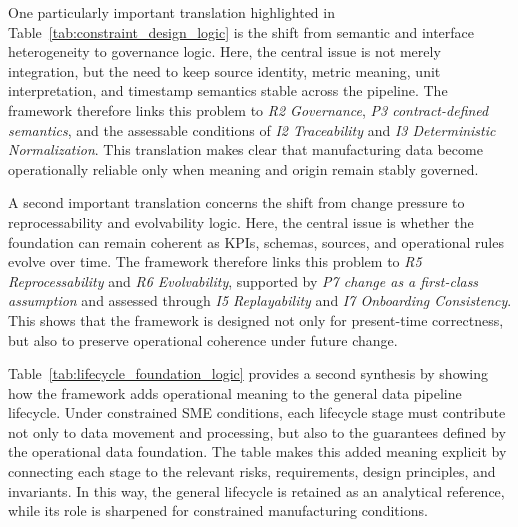 \documentclass[systems,article,submit,pdftex,moreauthors]{Definitions/mdpi}
\begin{document}
One particularly important translation highlighted in Table~\ref{tab:constraint_design_logic} is the shift from semantic and interface heterogeneity to governance logic. Here, the central issue is not merely integration, but the need to keep source identity, metric meaning, unit interpretation, and timestamp semantics stable across the pipeline. The framework therefore links this problem to \emph{R2 Governance}, \emph{P3 contract-defined semantics}, and the assessable conditions of \emph{I2 Traceability} and \emph{I3 Deterministic Normalization}. This translation makes clear that manufacturing data become operationally reliable only when meaning and origin remain stably governed.

A second important translation concerns the shift from change pressure to reprocessability and evolvability logic. Here, the central issue is whether the foundation can remain coherent as KPIs, schemas, sources, and operational rules evolve over time. The framework therefore links this problem to \emph{R5 Reprocessability} and \emph{R6 Evolvability}, supported by \emph{P7 change as a first-class assumption} and assessed through \emph{I5 Replayability} and \emph{I7 Onboarding Consistency}. This shows that the framework is designed not only for present-time correctness, but also to preserve operational coherence under future change.

Table~\ref{tab:lifecycle_foundation_logic} provides a second synthesis by showing how the framework adds operational meaning to the general data pipeline lifecycle. Under constrained SME conditions, each lifecycle stage must contribute not only to data movement and processing, but also to the guarantees defined by the operational data foundation. The table makes this added meaning explicit by connecting each stage to the relevant risks, requirements, design principles, and invariants. In this way, the general lifecycle is retained as an analytical reference, while its role is sharpened for constrained manufacturing conditions.
\end{document}
